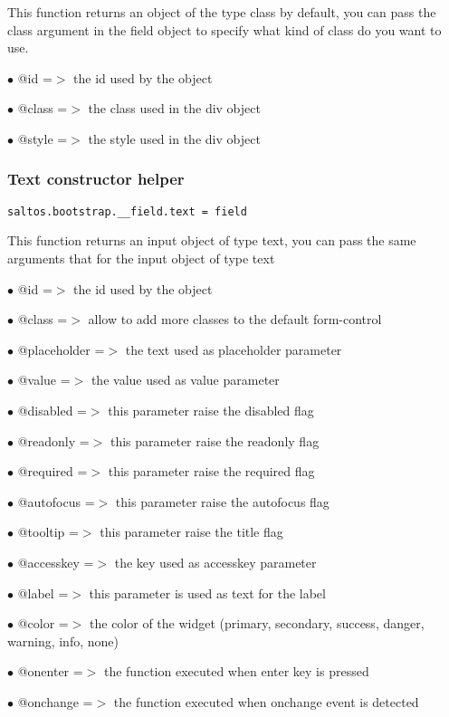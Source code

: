 \documentclass[a4paper]{article}
\begin{document}
This function returns an object of the type class by default, you can pass the class
argument in the field object to specify what kind of class do you want to use.

\begin{compactitem}
\item[\color{myblue}$\bullet$] @id    =$>$ the id used by the object
\item[\color{myblue}$\bullet$] @class =$>$ the class used in the div object
\item[\color{myblue}$\bullet$] @style =$>$ the style used in the div object
\end{compactitem}

\hypertarget{toc608}{}
\subsubsection{Text constructor helper}

\begin{lstlisting}
saltos.bootstrap.__field.text = field
\end{lstlisting}

This function returns an input object of type text, you can pass the same arguments
that for the input object of type text

\begin{compactitem}
\item[\color{myblue}$\bullet$] @id          =$>$ the id used by the object
\item[\color{myblue}$\bullet$] @class       =$>$ allow to add more classes to the default form-control
\item[\color{myblue}$\bullet$] @placeholder =$>$ the text used as placeholder parameter
\item[\color{myblue}$\bullet$] @value       =$>$ the value used as value parameter
\item[\color{myblue}$\bullet$] @disabled    =$>$ this parameter raise the disabled flag
\item[\color{myblue}$\bullet$] @readonly    =$>$ this parameter raise the readonly flag
\item[\color{myblue}$\bullet$] @required    =$>$ this parameter raise the required flag
\item[\color{myblue}$\bullet$] @autofocus   =$>$ this parameter raise the autofocus flag
\item[\color{myblue}$\bullet$] @tooltip     =$>$ this parameter raise the title flag
\item[\color{myblue}$\bullet$] @accesskey   =$>$ the key used as accesskey parameter
\item[\color{myblue}$\bullet$] @label       =$>$ this parameter is used as text for the label
\item[\color{myblue}$\bullet$] @color       =$>$ the color of the widget (primary, secondary, success, danger, warning, info, none)
\item[\color{myblue}$\bullet$] @onenter     =$>$ the function executed when enter key is pressed
\item[\color{myblue}$\bullet$] @onchange    =$>$ the function executed when onchange event is detected
\end{compactitem}
\end{document}
